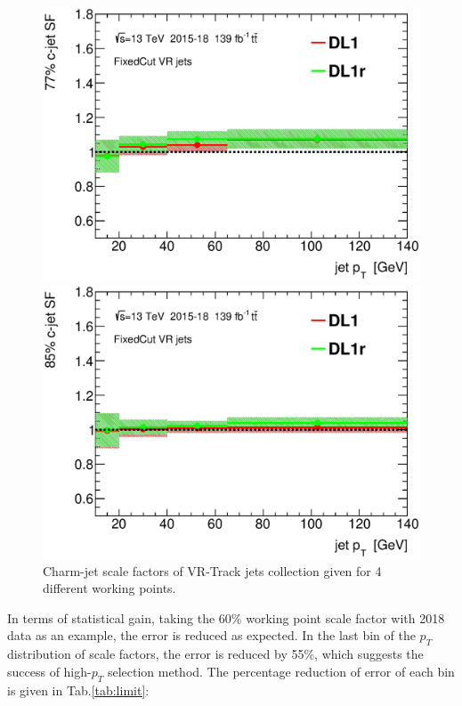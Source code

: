 \documentclass[letterpaper,12pt]{article}
\begin{document}
\begin{figure}[H]
\begin{minipage}[b]{.45\textwidth}
\includegraphics[width=1\textwidth]{SFplots_december/DL1allVRJetsDec_DL1rallVRJetsDec/SF77.eps}
\end{minipage}\hfill
\begin{minipage}[b]{.45\textwidth}
\centering
\includegraphics[width=1\textwidth]{SFplots_december/DL1allVRJetsDec_DL1rallVRJetsDec/SF85.eps}
\end{minipage}
\caption{Charm-jet scale factors of VR-Track jets collection 
given for 4 different working points.} \label{fig:Dec_SF_VRJets}
\end{figure}



\iffalse


In terms of statistical gain, taking the 60\% working point scale factor with 2018 data as an example, the error is reduced as expected. In the last bin of the $p_{T}$ distribution of scale factors, the error is reduced by 55\%, which suggests the success of high-$p_{T}$ selection method. The percentage reduction of error of each bin is given in Tab.\ref{tab:limit}:
\end{document}
